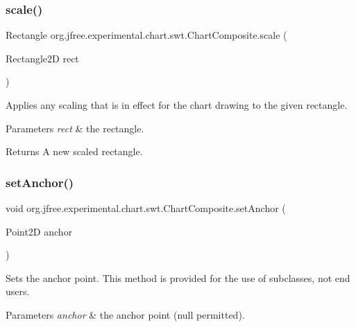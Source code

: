 \subsubsection{\texorpdfstring{scale()}{scale()}}
{\footnotesize\ttfamily Rectangle org.\+jfree.\+experimental.\+chart.\+swt.\+Chart\+Composite.\+scale (\begin{DoxyParamCaption}\item[{Rectangle2D}]{rect }\end{DoxyParamCaption})}

Applies any scaling that is in effect for the chart drawing to the given rectangle.


\begin{DoxyParams}{Parameters}
{\em rect} & the rectangle.\\
\hline
\end{DoxyParams}
\begin{DoxyReturn}{Returns}
A new scaled rectangle. 
\end{DoxyReturn}
\mbox{\label{classorg_1_1jfree_1_1experimental_1_1chart_1_1swt_1_1_chart_composite_a622422afa70309c512e16b8ed52eb02a}} 
\subsubsection{\texorpdfstring{set\+Anchor()}{setAnchor()}}
{\footnotesize\ttfamily void org.\+jfree.\+experimental.\+chart.\+swt.\+Chart\+Composite.\+set\+Anchor (\begin{DoxyParamCaption}\item[{Point2D}]{anchor }\end{DoxyParamCaption})\hspace{0.3cm}{\ttfamily [protected]}}

Sets the anchor point. This method is provided for the use of subclasses, not end users.


\begin{DoxyParams}{Parameters}
{\em anchor} & the anchor point ({\ttfamily null} permitted). \\
\hline
\end{DoxyParams}
\mbox{\label{classorg_1_1jfree_1_1experimental_1_1chart_1_1swt_1_1_chart_composite_a35617bfdc4735594e4b29916afab913e}} 
